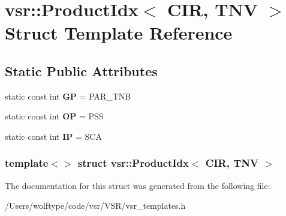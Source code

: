 \hypertarget{structvsr_1_1_product_idx_3_01_c_i_r_00_01_t_n_v_01_4}{\section{vsr\-:\-:Product\-Idx$<$ C\-I\-R, T\-N\-V $>$ Struct Template Reference}
\label{structvsr_1_1_product_idx_3_01_c_i_r_00_01_t_n_v_01_4}
}
\subsection*{Static Public Attributes}
\begin{DoxyCompactItemize}
\item 
\hypertarget{structvsr_1_1_product_idx_3_01_c_i_r_00_01_t_n_v_01_4_aa40c2a66d928ff2c5210397c8aad290d}{static const int {\bfseries G\-P} = P\-A\-R\-\_\-\-T\-N\-B}\label{structvsr_1_1_product_idx_3_01_c_i_r_00_01_t_n_v_01_4_aa40c2a66d928ff2c5210397c8aad290d}

\item 
\hypertarget{structvsr_1_1_product_idx_3_01_c_i_r_00_01_t_n_v_01_4_a9dec92837c614d7aa0d057bbd4fc2f2a}{static const int {\bfseries O\-P} = P\-S\-S}\label{structvsr_1_1_product_idx_3_01_c_i_r_00_01_t_n_v_01_4_a9dec92837c614d7aa0d057bbd4fc2f2a}

\item 
\hypertarget{structvsr_1_1_product_idx_3_01_c_i_r_00_01_t_n_v_01_4_a72919a30cb7d675b73898b1a28914bb0}{static const int {\bfseries I\-P} = S\-C\-A}\label{structvsr_1_1_product_idx_3_01_c_i_r_00_01_t_n_v_01_4_a72919a30cb7d675b73898b1a28914bb0}

\end{DoxyCompactItemize}
\subsubsection*{template$<$$>$ struct vsr\-::\-Product\-Idx$<$ C\-I\-R, T\-N\-V $>$}



The documentation for this struct was generated from the following file\-:\begin{DoxyCompactItemize}
\item 
/\-Users/wolftype/code/vsr/\-V\-S\-R/vsr\-\_\-templates.\-h\end{DoxyCompactItemize}
